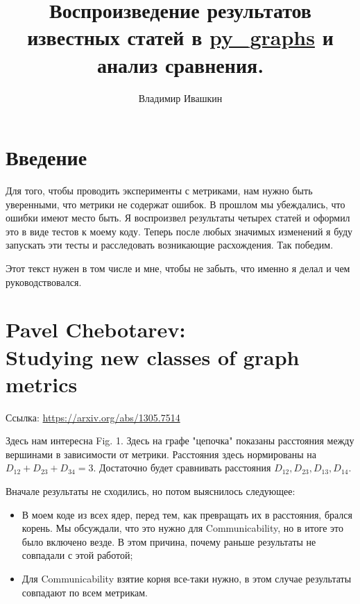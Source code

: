 \documentclass{article}
\title{
        Воспроизведение результатов известных статей в \href{https://github.com/illusionww/py_graphs}{py\_graphs} и анализ сравнения.
}
\author{Владимир Ивашкин}
\begin{document}
\maketitle


\section*{Введение}
Для того, чтобы проводить эксперименты с метриками, нам нужно быть уверенными, что метрики не содержат ошибок. В прошлом мы убеждались, что ошибки имеют место быть.
Я воспроизвел результаты четырех статей и оформил это в виде тестов к моему коду. Теперь после любых значимых изменений я буду запускать эти тесты и расследовать возникающие расхождения. Так победим.

Этот текст нужен в том числе и мне, чтобы не забыть, что именно я делал и чем руководствовался.


\section{Pavel Chebotarev:\\
         Studying new classes of graph metrics}
Ссылка: \url{https://arxiv.org/abs/1305.7514}

Здесь нам интересна Fig. 1. Здесь на графе "цепочка" показаны расстояния между вершинами в зависимости от метрики. Расстояния здесь нормированы на $D_{12} + D_{23} + D_{34} = 3$.
Достаточно будет сравнивать расстояния $D_{12}, D_{23}, D_{13}, D_{14}$.

Вначале результаты не сходились, но потом выяснилось следующее:
\begin{itemize}
  \item В моем коде из всех ядер, перед тем, как превращать их в расстояния, брался корень. Мы обсуждали, что это нужно для Communicability, но в итоге это было включено везде. В этом причина, почему раньше результаты не совпадали с этой работой;
  \item Для Communicability взятие корня все-таки нужно, в этом случае результаты совпадают по всем метрикам.
\end{itemize}
\end{document}
